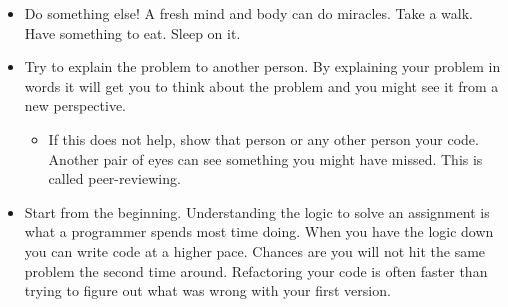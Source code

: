 \documentclass[11pt,a4paper,twoside]{article}
\begin{document}
\begin{itemize} 
    \item Do something else! A fresh mind and body can do miracles. Take a walk.
          Have something to eat. Sleep on it. 
    \item Try to explain the problem to another person. By explaining your 
          problem in words it will get you to think about the problem and you 
          might see it from a new perspective.  
    \begin{itemize}
        \item If this does not help, show that person or any other person
              your code. Another pair of eyes can see something you might have 
              missed. This is called peer-reviewing.
    \end{itemize}
    
    \item Start from the beginning. Understanding the logic to solve an 
          assignment is what a programmer spends most time doing. When you have
          the logic down you can write code at a higher pace. Chances are you
          will not hit the same problem the second time around. Refactoring your
          code is often faster than trying to figure out what was wrong with 
          your first version.
\end{itemize}
\end{document}
